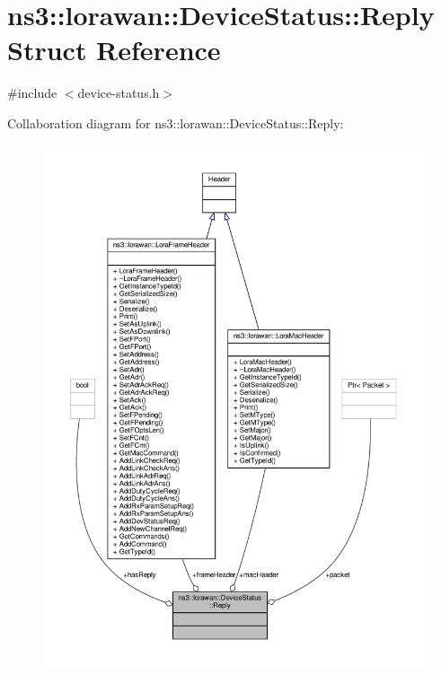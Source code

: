 \hypertarget{structns3_1_1lorawan_1_1DeviceStatus_1_1Reply}{}\section{ns3\+:\+:lorawan\+:\+:Device\+Status\+:\+:Reply Struct Reference}
\label{structns3_1_1lorawan_1_1DeviceStatus_1_1Reply}


{\ttfamily \#include $<$device-\/status.\+h$>$}



Collaboration diagram for ns3\+:\+:lorawan\+:\+:Device\+Status\+:\+:Reply\+:
\nopagebreak
\begin{figure}[H]
\begin{center}
\leavevmode
\includegraphics[width=350pt]{structns3_1_1lorawan_1_1DeviceStatus_1_1Reply__coll__graph}
\end{center}
\end{figure}
